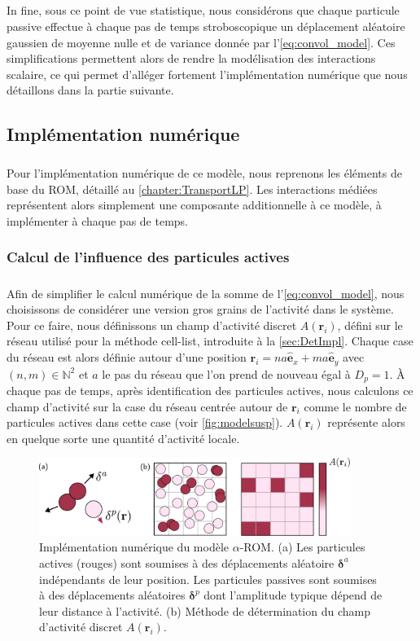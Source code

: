 \subparagraph{}In fine, sous ce point de vue statistique, nous considérons que chaque particule passive effectue à chaque pas de temps stroboscopique un déplacement aléatoire gaussien de moyenne nulle et de variance donnée par l'\autoref{eq:convol_model}. Ces simplifications permettent alors de rendre la modélisation des interactions scalaire, ce qui permet d'alléger fortement l'implémentation numérique que nous détaillons dans la partie suivante.

\subsection{Implémentation numérique}

\subparagraph{}Pour l'implémentation numérique de ce modèle, nous reprenons les éléments de base du ROM, détaillé au \autoref{chapter:TransportLP}. Les interactions médiées représentent alors simplement une composante additionnelle à ce modèle, à implémenter à chaque pas de temps. 

\subsubsection{Calcul de l'influence des particules actives}

\subparagraph{}Afin de simplifier le calcul numérique de la somme de l'\autoref{eq:convol_model}, nous choisissons de considérer une version gros grains de l'activité dans le système. Pour ce faire, nous définissons un champ d'activité discret $A(\mathbf{r}_i)$, défini sur le réseau utilisé pour la méthode cell-list, introduite à la \autoref{sec:DetImpl}. Chaque case du réseau est alors définie autour d'une position $\mathbf{r}_i = na\hat{\mathbf{e}}_x + ma \hat{\mathbf{e}}_y$ avec $(n,m) \in \mathbb{N}^2$ et $a$ le pas du réseau que l'on prend de nouveau égal à $D_p=1$. \`A chaque pas de temps, après identification des particules actives, nous calculons ce champ d'activité sur la case du réseau centrée autour de $\mathbf{r}_i$ comme le nombre de particules actives dans cette case (voir \autoref{fig:modelsusp}). $A(\mathbf{r}_i)$ représente alors en quelque sorte une quantité d'activité locale.

\begin{figure}[h]
	\centering
	\includegraphics[width=0.9\textwidth]{Chapitre3/Figures/Method/Model.pdf}
	\caption{Implémentation numérique du modèle $\alpha$-ROM. (a) Les particules actives (rouges) sont soumises à des déplacements aléatoire $\boldsymbol\delta^a$ indépendants de leur position. Les particules passives sont soumises à des déplacements aléatoires $\boldsymbol\delta^p$ dont l'amplitude typique dépend de leur distance à l'activité. (b) Méthode de détermination du champ d'activité discret $A(\mathbf{r}_i)$.}
	\label{fig:modelsusp}
\end{figure}

